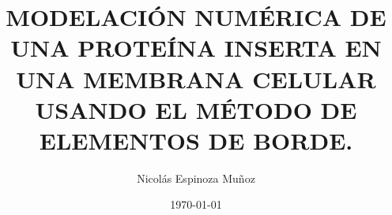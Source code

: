 \documentclass[12pt, oneside, numbers, spanish]{ezthesis}
\date{\today}
\author{Nicolás Espinoza Muñoz}
\title{MODELACIÓN NUMÉRICA DE UNA PROTEÍNA INSERTA EN UNA MEMBRANA CELULAR USANDO EL MÉTODO DE ELEMENTOS DE BORDE.}
\numberwithin{equation}{section}
\begin{document}

\pagebreak



\tableofcontents
\newpage
\end{document}
